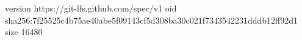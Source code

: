version https://git-lfs.github.com/spec/v1
oid sha256:7f25525c4b75ae40abe5f09143cf5d308ba30c021f7343542231dddb12ff92d1
size 16480
